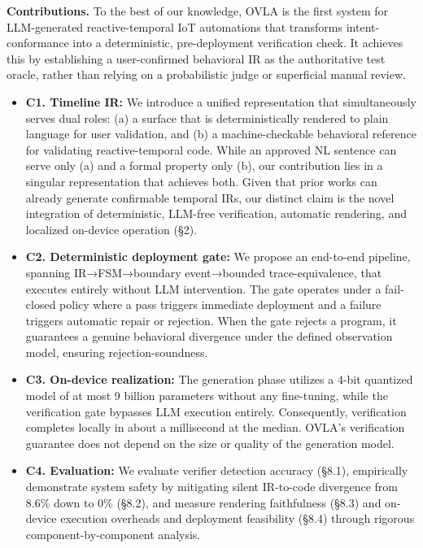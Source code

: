 \documentclass[sigconf,nonacm,anonymous,review]{acmart}
\begin{document}
\medskip\noindent\textbf{Contributions.} 
To the best of our knowledge, OVLA is the first system for LLM-generated reactive-temporal IoT automations that transforms intent-conformance into a deterministic, pre-deployment verification check. It achieves this by establishing a user-confirmed behavioral IR as the authoritative test oracle, rather than relying on a probabilistic judge or superficial manual review.
\begin{itemize}
\item \textbf{C1. Timeline IR:} We introduce a unified representation that simultaneously serves dual roles:
(a) a surface that is deterministically rendered to plain language for user validation, and (b) a machine-checkable behavioral reference for validating reactive-temporal code. While an approved NL sentence can serve only (a) and a formal property only (b), our contribution lies in a singular representation that achieves both. Given that prior works can already generate confirmable temporal IRs, our distinct claim is the novel integration of deterministic, LLM-free verification, automatic rendering, and localized on-device operation
(\S2).
\item \textbf{C2. Deterministic deployment gate:} We propose an end-to-end pipeline, spanning IR→FSM→boundary event→bounded trace-equivalence, that executes entirely without LLM intervention. The gate operates under a fail-closed policy where a pass triggers immediate deployment and a failure triggers automatic repair or rejection.
When the gate rejects a program, it guarantees a genuine behavioral divergence under the defined observation model, ensuring rejection-soundness.
\item \textbf{C3. On-device realization:} The generation phase utilizes a 4-bit quantized model of at most 9 billion parameters without any fine-tuning, while the verification gate bypasses LLM execution entirely. Consequently, verification completes locally in about a millisecond at the median. OVLA's verification guarantee does not depend on the size or quality of the generation model.
\item \textbf{C4. Evaluation:} We evaluate verifier detection accuracy (\S8.1), empirically demonstrate system safety by mitigating silent IR-to-code divergence from 8.6\% down to 0\% (\S8.2), and measure rendering faithfulness (\S8.3) and on-device execution overheads and deployment feasibility (\S8.4) through rigorous component-by-component analysis.
\end{itemize}
\end{document}
